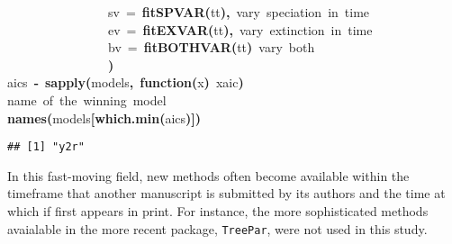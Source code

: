 \documentclass{elsarticle}
\makeatletter
\newcommand{\hlfunctioncall}[1]{\textcolor[rgb]{.5,0,.33}{\textbf{#1}}}%
\newcommand{\hlkeyword}[1]{\textbf{#1}}%
\newcommand{\hlargument}[1]{\textcolor[rgb]{.69,.25,.02}{#1}}%
\newcommand{\hlcomment}[1]{\textcolor[rgb]{.18,.6,.34}{#1}}%
\newcommand{\hlformalargs}[1]{\hlargument{#1}}%
\newcommand{\hlassignement}[1]{\textbf{#1}}%
\newcommand{\hlsymbol}[1]{#1}%
\newcommand{\hlstd}[1]{\textcolor[rgb]{0,0,0}{#1}}%
\newenvironment{kframe}{%
 \def\FrameCommand##1{\hskip\@totalleftmargin \hskip-\fboxsep
 \colorbox{shadecolor}{##1}\hskip-\fboxsep
     \hskip-\linewidth \hskip-\@totalleftmargin \hskip\columnwidth}%
 \MakeFramed {\advance\hsize-\width
   \@totalleftmargin\z@ \linewidth\hsize
   \@setminipage}}%
 {\par\unskip\endMakeFramed}
\newenvironment{knitrout}{}{} %
\makeatother
\begin{document}
\begin{knitrout}
{\begin{kframe}
\begin{flushleft}
\hlstd{}{\ }{\ }{\ }{\ }{\ }{\ }{\ }{\ }{\ }{\ }{\ }{\ }{\ }{\ }{\ }{\ }\hlargument{sv}{\ }\hlargument{=}{\ }\hlfunctioncall{fitSPVAR}\hlkeyword{(}\hlsymbol{tt}\hlkeyword{)}\hlkeyword{,}{\ }\hlcomment{\usebox{\hlnormalsizeboxhash}{\ }vary{\ }speciation{\ }in{\ }time}\hspace*{\fill}\\
\hlstd{}{\ }{\ }{\ }{\ }{\ }{\ }{\ }{\ }{\ }{\ }{\ }{\ }{\ }{\ }{\ }{\ }\hlargument{ev}{\ }\hlargument{=}{\ }\hlfunctioncall{fitEXVAR}\hlkeyword{(}\hlsymbol{tt}\hlkeyword{)}\hlkeyword{,}{\ }\hlcomment{\usebox{\hlnormalsizeboxhash}{\ }vary{\ }extinction{\ }in{\ }time}\hspace*{\fill}\\
\hlstd{}{\ }{\ }{\ }{\ }{\ }{\ }{\ }{\ }{\ }{\ }{\ }{\ }{\ }{\ }{\ }{\ }\hlargument{bv}{\ }\hlargument{=}{\ }\hlfunctioncall{fitBOTHVAR}\hlkeyword{(}\hlsymbol{tt}\hlkeyword{)}{\ }\hlcomment{\usebox{\hlnormalsizeboxhash}{\ }vary{\ }both}\hspace*{\fill}\\
\hlstd{}{\ }{\ }{\ }{\ }{\ }{\ }{\ }{\ }{\ }{\ }{\ }{\ }{\ }{\ }{\ }{\ }\hlkeyword{)}\hspace*{\fill}\\
\hlstd{}\hlsymbol{aics}{\ }\hlassignement{\usebox{\hlnormalsizeboxlessthan}-}{\ }\hlfunctioncall{sapply}\hlkeyword{(}\hlsymbol{models}\hlkeyword{,}{\ }\hlkeyword{function}\hlkeyword{(}\hlformalargs{x}\hlkeyword{)}{\ }\hlsymbol{x}\hlkeyword{\usebox{\hlnormalsizeboxdollar}}\hlsymbol{aic}\hlkeyword{)}\hspace*{\fill}\\
\hlstd{}\hlcomment{\usebox{\hlnormalsizeboxhash}{\ }name{\ }of{\ }the{\ }winning{\ }model}\hspace*{\fill}\\
\hlstd{}\hlfunctioncall{names}\hlkeyword{(}\hlsymbol{models}\hlkeyword{[}\hlfunctioncall{which.min}\hlkeyword{(}\hlsymbol{aics}\hlkeyword{)}\hlkeyword{]}\hlkeyword{)}\mbox{}
\normalfont
\end{flushleft}
\begin{verbatim}
## [1] "y2r"
\end{verbatim}
\end{kframe}}
\end{knitrout}


In this fast-moving field, new methods often become available within the timeframe that another manuscript is submitted by its authors and the time at which if first appears in print.  For instance, the more sophisticated methods avaialable in the more recent package, \texttt{TreePar}, were not used in this study. 
\end{document}
